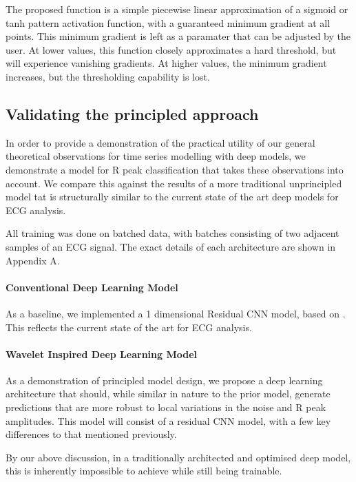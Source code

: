 \documentclass[9pt,conference]{IEEEtran}
\begin{document}
The proposed function is a simple piecewise linear approximation of a sigmoid or tanh pattern activation function, with a guaranteed minimum gradient at all points. This minimum gradient is left as a paramater that can be adjusted by the user. At lower values, this function closely approximates a hard threshold, but will experience vanishing gradients. At higher values,  the minimum gradient increases, but the thresholding capability is lost.

\subsection{Validating the principled approach}
In order to provide a demonstration of the practical utility of our general theoretical observations for time series modelling with deep models, we demonstrate a model for R peak classification that takes these observations into account. We compare this against the results of a more traditional unprincipled model tat is structurally similar to the current state of the art deep models for ECG analysis.

All training was done on batched data, with batches consisting of two adjacent samples of an ECG signal. The exact details of each architecture are shown in Appendix A.


\paragraph{\textbf{Conventional Deep Learning Model}}
As a baseline, we implemented a 1 dimensional Residual CNN model, based on \cite{stanfordML}. This reflects the current state of the art for ECG analysis.




\paragraph{\textbf{Wavelet Inspired Deep Learning Model}}
As a demonstration of principled model design, we propose a deep learning architecture that should, while similar in nature to the prior model, generate predictions that are more robust to local variations in the noise and R peak amplitudes. This model will consist of a residual CNN model, with a few key differences to that mentioned previously.

By our above discussion, in a traditionally architected and optimised deep model, this is inherently impossible to achieve while still being trainable. 
\end{document}
